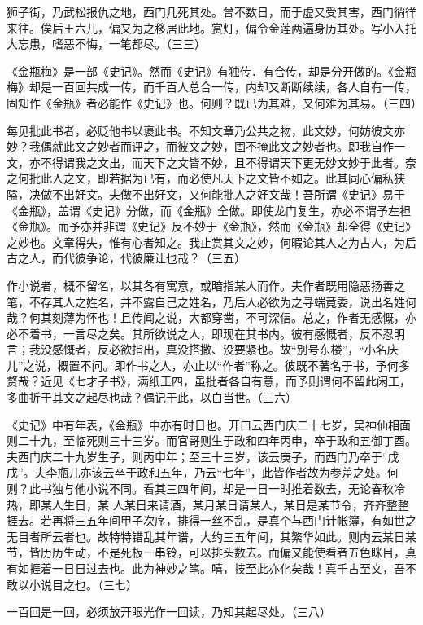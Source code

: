 \begin{showcontents}{}
{狮子街，乃武松报仇之地，西门几死其处。曾不数日，而于虚又受其害，西门徜徉来往。俟后王六儿，偏又为之移居此地。赏灯，偏令金莲两遍身历其处。写小入托大忘患，嗜恶不悔，一笔都尽。（三三）

《金瓶梅》是一部《史记》。然而《史记》有独传．有合传，却是分开做的。《金瓶梅》却是一百回共成一传，而千百人总合一传，内却又断断续续，各人自有一传，固知作《金瓶》者必能作《史记》也。何则？既已为其难，又何难为其易。（三四）

每见批此书者，必贬他书以褒此书。不知文章乃公共之物，此文妙，何妨彼文亦妙？我偶就此文之妙者而评之，而彼文之妙，固不掩此文之妙者也。即我自作一文，亦不得谓我之文出，而天下之文皆不妙，且不得谓天下更无妙文妙于此者。奈之何批此人之文，即若据为已有，而必使凡天下之文皆不如之。此其同心偏私狭隘，决做不出好文。夫做不出好文，又何能批人之好文哉！吾所谓《史记》易于《金瓶》，盖谓《史记》分做，而《金瓶》全做。即使龙门复生，亦必不谓予左袒《金瓶》。而予亦并非谓《史记》反不妙于《金瓶》，然而《金瓶》却全得《史记》之妙也。文章得失，惟有心者知之。我止赏其文之妙，何暇论其人之为古人，为后古之人，而代彼争论，代彼廉让也哉？（三五）

作小说者，概不留名，以其各有寓意，或暗指某人而作。夫作者既用隐恶扬善之笔，不存其人之姓名，并不露自己之姓名，乃后人必欲为之寻端竟委，说出名姓何哉？何其刻薄为怀也！且传闻之说，大都穿凿，不可深信。总之，作者无感慨，亦必不着书，一言尽之矣。其所欲说之人，即现在其书内。彼有感慨者，反不忍明言；我没感慨者，反必欲指出，真没搭撒、没要紧也。故“别号东楼”，“小名庆儿”之说，概置不问。即作书之人，亦止以“作者”称之。彼既不著名于书，予何多赘哉？近见《七才子书》，满纸王四，虽批者各自有意，而予则谓何不留此闲工，多曲折于其文之起尽也哉？偶记于此，以白当世。（三六）

《史记》中有年表，《金瓶》中亦有时日也。开口云西门庆二十七岁，吴神仙相面则二十九，至临死则三十三岁。而官哥则生于政和四年丙申，卒于政和五御丁酉。夫西门庆二十九岁生子，则丙申年；至三十三岁，该云庚子，而西门乃卒于“戊戌”。夫李瓶儿亦该云卒于政和五年，乃云“七年”，此皆作者故为参差之处。何则？此书独与他小说不同。看其三四年间，却是一日一时推着数去，无论春秋冷热，即某人生日，某
人某日来请酒，某月某日请某人，某日是某节令，齐齐整整捱去。若再将三五年间甲子次序，排得一丝不乱，是真个与西门计帐簿，有如世之无目者所云者也。故特特错乱其年谱，大约三五年间，其繁华如此。则内云某日某节，皆历历生动，不是死板一串铃，可以排头数去。而偏又能使看者五色眯目，真有如捱着一日日过去也。此为神妙之笔。嘻，技至此亦化矣哉！真千古至文，吾不敢以小说目之也。（三七）

一百回是一回，必须放开眼光作一回读，乃知其起尽处。（三八）

}
\end{showcontents}
